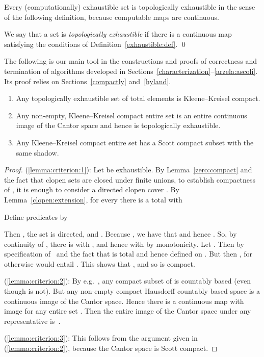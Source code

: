 \documentclass{LMCS}
\newcommand{\licsmath}[1]{}
\begin{document}
Every (computationally) exhaustible set is topologically exhaustible
in the sense of the following definition, because computable maps are
continuous.
\begin{defi} \label{topologically:exhaustible} \leavevmode
We say that a set  is \emph{topologically
    exhaustible} if there is a continuous map  satisfying the conditions of
  Definition~\ref{exhaustible:def}. \qed
\end{defi}
\noindent The following is our main tool in the constructions and
proofs of correctness and termination of algorithms developed in
Sections~\ref{characterization}--\ref{arzela:ascoli}.  Its proof relies on
Sections~\ref{compactly} and~\ref{hyland}.  \pagebreak[3]
\begin{lem} \label{lemma:criterion} \leavevmode 
  \begin{enumerate}
  \item \label{lemma:criterion:1} Any topologically
    exhaustible set of total elements is Kleene--Kreisel compact.

  \item \label{lemma:criterion:2} Any non-empty, Kleene--Kreisel
    compact entire set is an entire continuous image of the Cantor
    space and hence is topologically exhaustible.



  \item \label{lemma:criterion:3} Any Kleene--Kreisel compact entire
    set has a Scott compact subset with the same shadow.
  \end{enumerate}
\end{lem}
\pagebreak[3]
\begin{proof}
  (\ref{lemma:criterion:1}): Let  be exhaustible. By
  Lemma~\ref{zero:compact} and the fact that clopen sets are closed
  under finite unions, to establish compactness of , it is
  enough to consider a directed clopen cover . By
  Lemma~\ref{clopen:extension}, for every  there is
  a total  with
\licsmath{(\dagger) \quad \text{ and .}}
Define predicates  by
    
  Then , the set  is directed, and . Because , we have that
   and hence . So, by
  continuity of , there is  with
  , and hence with  by
  monotonicity.  Let . Then  by specification
  of~ and the fact that  is total and hence defined on
  .  But then , for otherwise  would
  entail .  This shows that , and
  so  is compact.

\medskip

(\ref{lemma:criterion:2}): By e.g.\ \cite{escardo:lawson:simpson}, any
compact subset of  is countably based (even though  is not). But
any non-empty compact Hausdorff countably based space is a continuous
image of the Cantor space. Hence there is a continuous map
 with image  for any entire set . Then the entire image of the Cantor space under any
representative  is~.

(\ref{lemma:criterion:3}): This follows from the argument given in
(\ref{lemma:criterion:2}), because the Cantor space is Scott compact.
\end{proof}
\end{document}
